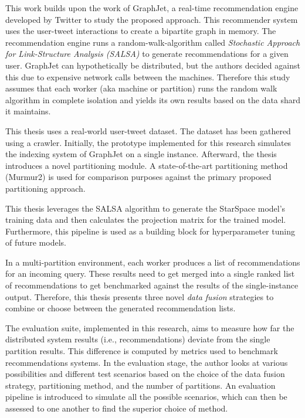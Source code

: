 This work builds upon the work of GraphJet, a real-time recommendation engine developed by Twitter to study the proposed approach. This recommender system uses the user-tweet interactions to create a bipartite graph in memory. The recommendation engine runs a random-walk-algorithm called \emph{Stochastic Approach for Link-Structure Analysis (SALSA)} to generate recommendations for a given user. GraphJet can hypothetically be distributed, but the authors decided against this due to expensive network calls between the machines. Therefore this study assumes that each worker (aka machine or partition) runs the random walk algorithm in complete isolation and yields its own results based on the data shard it maintains. 


This thesis uses a real-world user-tweet dataset. The dataset has been gathered using a crawler. Initially, the prototype implemented for this research simulates the indexing system of GraphJet on a single instance. Afterward, the thesis introduces a novel partitioning module. A state-of-the-art partitioning method (Murmur2) is used for comparison purposes against the primary proposed partitioning approach.


This thesis leverages the SALSA algorithm to generate the StarSpace model's training data and then calculates the projection matrix for the trained model. Furthermore, this pipeline is used as a building block for hyperparameter tuning of future models. 


In a multi-partition environment, each worker produces a list of recommendations for an incoming query. These results need to get merged into a single ranked list of recommendations to get benchmarked against the results of the single-instance output. Therefore, this thesis presents three novel \emph{data fusion} strategies to combine or choose between the generated recommendation lists.


The evaluation suite, implemented in this research, aims to measure how far the distributed system results (i.e., recommendations) deviate from the single partition results. This difference is computed by metrics used to benchmark recommendations systems. In the evaluation stage, the author looks at various possibilities and different test scenarios based on the choice of the data fusion strategy, partitioning method, and the number of partitions. An evaluation pipeline is introduced to simulate all the possible scenarios, which can then be assessed to one another to find the superior choice of method.


 